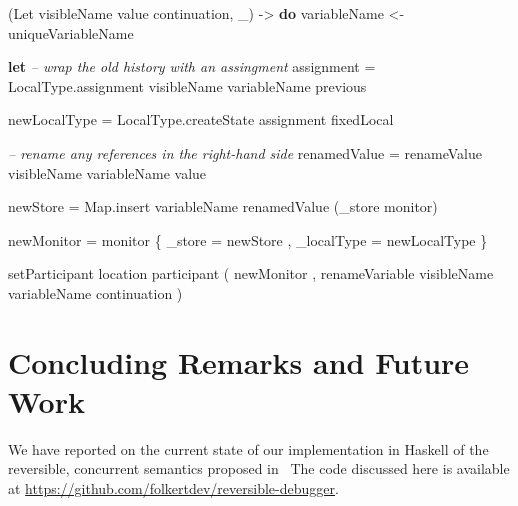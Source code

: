 \documentclass[runningheads]{llncs}
\newenvironment{Shaded}{}{}
\newcommand{\KeywordTok}[1]{\textcolor[rgb]{0.00,0.44,0.13}{\textbf{#1}}}
\newcommand{\DataTypeTok}[1]{\textcolor[rgb]{0.56,0.13,0.00}{#1}}
\newcommand{\CommentTok}[1]{\textcolor[rgb]{0.38,0.63,0.69}{\textit{#1}}}
\newcommand{\OtherTok}[1]{\textcolor[rgb]{0.00,0.44,0.13}{#1}}
\newcommand{\FunctionTok}[1]{\textcolor[rgb]{0.02,0.16,0.49}{#1}}
\newcommand{\NormalTok}[1]{#1}
\begin{document}
\begin{Shaded}
\begin{Highlighting}[]
\NormalTok{(}\DataTypeTok{Let}\NormalTok{ visibleName value continuation, _) }\OtherTok{->} \KeywordTok{do}
\NormalTok{    variableName }\OtherTok{<-}\NormalTok{ uniqueVariableName }

    \KeywordTok{let} 
        \CommentTok{-- wrap the old history with an assingment}
\NormalTok{        assignment }\FunctionTok{=} 
\NormalTok{            LocalType.assignment visibleName variableName previous}

\NormalTok{        newLocalType }\FunctionTok{=} 
\NormalTok{            LocalType.createState assignment fixedLocal}

        \CommentTok{-- rename any references in the right-hand side}
\NormalTok{        renamedValue }\FunctionTok{=}\NormalTok{ renameValue visibleName variableName value}

\NormalTok{        newStore }\FunctionTok{=} 
\NormalTok{            Map.insert variableName renamedValue (_store monitor)}

\NormalTok{        newMonitor }\FunctionTok{=}\NormalTok{ monitor }
\NormalTok{            \{ _store }\FunctionTok{=}\NormalTok{ newStore}
\NormalTok{            , _localType }\FunctionTok{=}\NormalTok{ newLocalType }
\NormalTok{            \}  }
    
\NormalTok{    setParticipant location participant }
\NormalTok{        ( newMonitor}
\NormalTok{        , renameVariable visibleName variableName continuation }
\NormalTok{        )}
\end{Highlighting}
\end{Shaded}



\section{Concluding Remarks and Future
Work}\label{concluding-remarks-and-future-work}

We have reported on the current state of our implementation in Haskell
of the reversible, concurrent semantics proposed in~\cite{DBLP:conf/ppdp/MezzinaP17}
The code discussed here is available at
\url{https://github.com/folkertdev/reversible-debugger}.
\end{document}
